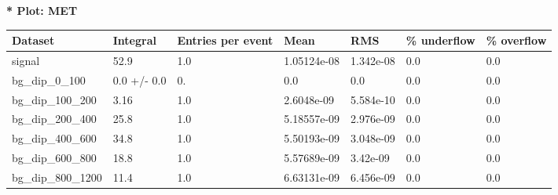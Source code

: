 \documentclass[a4paper, 10pt]{article}
\begin{document}
\textbf{* Plot: MET}\\
   \begin{table}[H]
  \begin{center}
    \begin{tabular}{|m{23.0mm}|m{23.0mm}|m{18.0mm}|m{19.0mm}|m{19.0mm}|m{19.0mm}|m{19.0mm}|}
      \hline
      {\cellcolor{yellow}         Dataset}& {\cellcolor{yellow}         Integral}& {\cellcolor{yellow}         Entries per event}& {\cellcolor{yellow}         Mean}& {\cellcolor{yellow}         RMS}& {\cellcolor{yellow}         \% underflow}& {\cellcolor{yellow}         \% overflow}\\
      \hline
      {\cellcolor{white}         signal}& {\cellcolor{white}         52.9}& {\cellcolor{white}         1.0}& {\cellcolor{white}         1.05124e-08}& {\cellcolor{white}         1.342e-08}& {\cellcolor{green}         0.0}& {\cellcolor{green}         0.0}\\
      \hline
      {\cellcolor{white}         bg\_dip\_0\_100}& {\cellcolor{white}         0.0 +/\-- 0.0}& {\cellcolor{white}         0.}& {\cellcolor{white}         0.0}& {\cellcolor{white}         0.0}& {\cellcolor{green}         0.0}& {\cellcolor{green}         0.0}\\
      \hline
      {\cellcolor{white}         bg\_dip\_100\_200}& {\cellcolor{white}         3.16}& {\cellcolor{white}         1.0}& {\cellcolor{white}         2.6048e-09}& {\cellcolor{white}         5.584e-10}& {\cellcolor{green}         0.0}& {\cellcolor{green}         0.0}\\
      \hline
      {\cellcolor{white}         bg\_dip\_200\_400}& {\cellcolor{white}         25.8}& {\cellcolor{white}         1.0}& {\cellcolor{white}         5.18557e-09}& {\cellcolor{white}         2.976e-09}& {\cellcolor{green}         0.0}& {\cellcolor{green}         0.0}\\
      \hline
      {\cellcolor{white}         bg\_dip\_400\_600}& {\cellcolor{white}         34.8}& {\cellcolor{white}         1.0}& {\cellcolor{white}         5.50193e-09}& {\cellcolor{white}         3.048e-09}& {\cellcolor{green}         0.0}& {\cellcolor{green}         0.0}\\
      \hline
      {\cellcolor{white}         bg\_dip\_600\_800}& {\cellcolor{white}         18.8}& {\cellcolor{white}         1.0}& {\cellcolor{white}         5.57689e-09}& {\cellcolor{white}         3.42e-09}& {\cellcolor{green}         0.0}& {\cellcolor{green}         0.0}\\
      \hline
      {\cellcolor{white}         bg\_dip\_800\_1200}& {\cellcolor{white}         11.4}& {\cellcolor{white}         1.0}& {\cellcolor{white}         6.63131e-09}& {\cellcolor{white}         6.456e-09}& {\cellcolor{green}         0.0}& {\cellcolor{green}         0.0}\\

\end{tabular}
\end{center}
\end{table}
\end{document}
